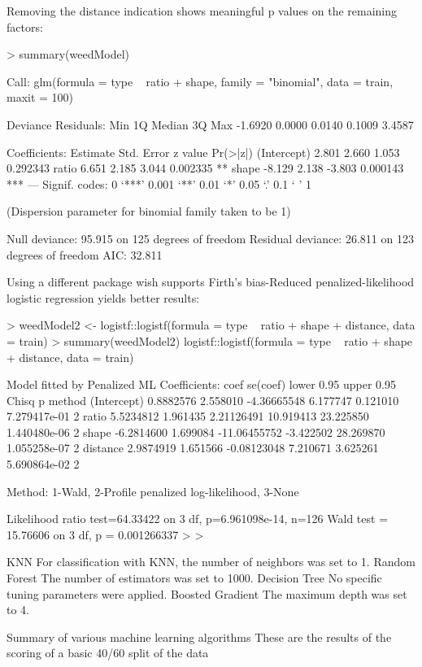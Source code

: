 \documentclass[letterpaper]{article}
\begin{document}
Removing the distance indication shows meaningful p values on the remaining factors:

> summary(weedModel)

Call:
glm(formula = type ~ ratio + shape, family = "binomial", data = train, 
    maxit = 100)

Deviance Residuals: 
    Min       1Q   Median       3Q      Max  
-1.6920   0.0000   0.0140   0.1009   3.4587  

Coefficients:
            Estimate Std. Error z value Pr(>|z|)    
(Intercept)    2.801      2.660   1.053 0.292343    
ratio          6.651      2.185   3.044 0.002335 ** 
shape         -8.129      2.138  -3.803 0.000143 ***
---
Signif. codes:  0 ‘***’ 0.001 ‘**’ 0.01 ‘*’ 0.05 ‘.’ 0.1 ‘ ’ 1

(Dispersion parameter for binomial family taken to be 1)

    Null deviance: 95.915  on 125  degrees of freedom
Residual deviance: 26.811  on 123  degrees of freedom
AIC: 32.811

Using a different package wish supports Firth's bias-Reduced penalized-likelihood logistic regression yields better results:

> weedModel2 <- logistf::logistf(formula = type ~ ratio + shape + distance, data = train)
> summary(weedModel2)
logistf::logistf(formula = type ~ ratio + shape + distance, data = train)

Model fitted by Penalized ML
Coefficients:
                  coef se(coef)   lower 0.95 upper 0.95     Chisq            p method
(Intercept)  0.8882576 2.558010  -4.36665548   6.177747  0.121010 7.279417e-01      2
ratio        5.5234812 1.961435   2.21126491  10.919413 23.225850 1.440480e-06      2
shape       -6.2814600 1.699084 -11.06455752  -3.422502 28.269870 1.055258e-07      2
distance     2.9874919 1.651566  -0.08123048   7.210671  3.625261 5.690864e-02      2

Method: 1-Wald, 2-Profile penalized log-likelihood, 3-None

Likelihood ratio test=64.33422 on 3 df, p=6.961098e-14, n=126
Wald test = 15.76606 on 3 df, p = 0.001266337
> 
> 




KNN
For classification with KNN, the number of neighbors was set to 1.
Random Forest
The number of estimators was set to 1000.
Decision Tree
No specific tuning parameters were applied.
Boosted Gradient
The maximum depth was set to 4.

Summary of various machine learning algorithms
These are the results of the scoring of a basic 40/60 split of the data
\end{document}

